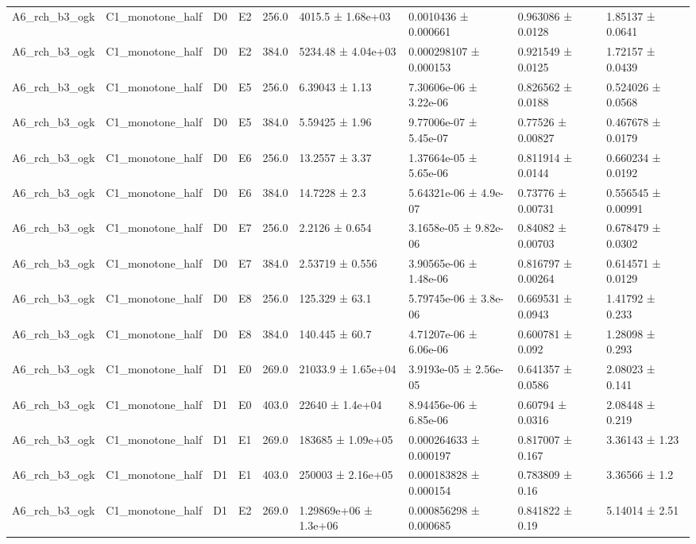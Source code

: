 \begin{table}
\begin{tabular}{lllllllll}
A6\_rch\_b3\_ogk & C1\_monotone\_half & D0 & E2 & 256.0 & 4015.5 ± 1.68e+03 & 0.0010436 ± 0.000661 & 0.963086 ± 0.0128 & 1.85137 ± 0.0641 \\
A6\_rch\_b3\_ogk & C1\_monotone\_half & D0 & E2 & 384.0 & 5234.48 ± 4.04e+03 & 0.000298107 ± 0.000153 & 0.921549 ± 0.0125 & 1.72157 ± 0.0439 \\
A6\_rch\_b3\_ogk & C1\_monotone\_half & D0 & E5 & 256.0 & 6.39043 ± 1.13 & 7.30606e-06 ± 3.22e-06 & 0.826562 ± 0.0188 & 0.524026 ± 0.0568 \\
A6\_rch\_b3\_ogk & C1\_monotone\_half & D0 & E5 & 384.0 & 5.59425 ± 1.96 & 9.77006e-07 ± 5.45e-07 & 0.77526 ± 0.00827 & 0.467678 ± 0.0179 \\
A6\_rch\_b3\_ogk & C1\_monotone\_half & D0 & E6 & 256.0 & 13.2557 ± 3.37 & 1.37664e-05 ± 5.65e-06 & 0.811914 ± 0.0144 & 0.660234 ± 0.0192 \\
A6\_rch\_b3\_ogk & C1\_monotone\_half & D0 & E6 & 384.0 & 14.7228 ± 2.3 & 5.64321e-06 ± 4.9e-07 & 0.73776 ± 0.00731 & 0.556545 ± 0.00991 \\
A6\_rch\_b3\_ogk & C1\_monotone\_half & D0 & E7 & 256.0 & 2.2126 ± 0.654 & 3.1658e-05 ± 9.82e-06 & 0.84082 ± 0.00703 & 0.678479 ± 0.0302 \\
A6\_rch\_b3\_ogk & C1\_monotone\_half & D0 & E7 & 384.0 & 2.53719 ± 0.556 & 3.90565e-06 ± 1.48e-06 & 0.816797 ± 0.00264 & 0.614571 ± 0.0129 \\
A6\_rch\_b3\_ogk & C1\_monotone\_half & D0 & E8 & 256.0 & 125.329 ± 63.1 & 5.79745e-06 ± 3.8e-06 & 0.669531 ± 0.0943 & 1.41792 ± 0.233 \\
A6\_rch\_b3\_ogk & C1\_monotone\_half & D0 & E8 & 384.0 & 140.445 ± 60.7 & 4.71207e-06 ± 6.06e-06 & 0.600781 ± 0.092 & 1.28098 ± 0.293 \\
A6\_rch\_b3\_ogk & C1\_monotone\_half & D1 & E0 & 269.0 & 21033.9 ± 1.65e+04 & 3.9193e-05 ± 2.56e-05 & 0.641357 ± 0.0586 & 2.08023 ± 0.141 \\
A6\_rch\_b3\_ogk & C1\_monotone\_half & D1 & E0 & 403.0 & 22640 ± 1.4e+04 & 8.94456e-06 ± 6.85e-06 & 0.60794 ± 0.0316 & 2.08448 ± 0.219 \\
A6\_rch\_b3\_ogk & C1\_monotone\_half & D1 & E1 & 269.0 & 183685 ± 1.09e+05 & 0.000264633 ± 0.000197 & 0.817007 ± 0.167 & 3.36143 ± 1.23 \\
A6\_rch\_b3\_ogk & C1\_monotone\_half & D1 & E1 & 403.0 & 250003 ± 2.16e+05 & 0.000183828 ± 0.000154 & 0.783809 ± 0.16 & 3.36566 ± 1.2 \\
A6\_rch\_b3\_ogk & C1\_monotone\_half & D1 & E2 & 269.0 & 1.29869e+06 ± 1.3e+06 & 0.000856298 ± 0.000685 & 0.841822 ± 0.19 & 5.14014 ± 2.51 \\

\end{tabular}
\end{table}
